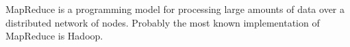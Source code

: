 MapReduce is a programming model for processing large amounts of data over a distributed network of nodes. Probably the most known implementation of MapReduce is Hadoop. \cite{Hadoop}
